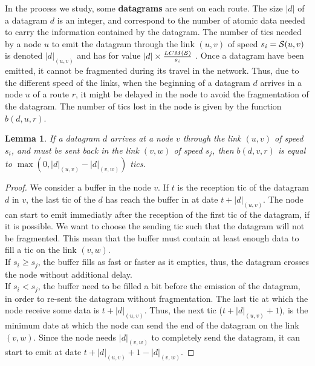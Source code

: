 \documentclass[10pt]{article}
\newtheorem{lemma}[theorem]{Lemma}
\begin{document}
        In the process we study, some {\bf datagrams} are sent on each route. The size $|d|$ of a datagram $d$ is an integer, and correspond to the number of atomic data needed to carry the information contained by the datagram. The number of tics needed by a node $u$ to emit the datagram through the link $(u,v)$ of speed $s_i = {\cal S}(u,v)$ is denoted $|d|_{(u,v)}$ and has for value $ |d| \times \frac{LCM({\cal S})}{s_i}$ . Once a datagram have been emitted, it cannot be fragmented during its travel in the network. Thus, due to the different speed of the links, when the beginning of a datagram $d$ arrives in a node $u$ of a route $r$, it might be delayed in the node to avoid the fragmentation of the datagram. The number of tics lost in the node is given by the function $b(d,u,r)$.\\
        \begin{lemma}
        If a datagram $d$ arrives at a node $v$ through the link $(u,v)$ of speed $s_i$, and must be sent back in the link $(v,w)$ of speed $s_j$, then $b(d,v,r)$ is equal to $ \max( 0, |d|_{(u,v)} - |d|_{(v,w)} )$ tics.
        \end{lemma}
        \begin{proof}
        We consider a buffer in the node $v$. If $t$ is the reception tic of the datagram $d$ in $v$, the last tic of the $d$ has reach the buffer in at date $t+|d|_{(u,v)}$. The node can start to emit immediatly after the reception of the first tic of the datagram, if it is possible. We want to choose the sending tic such that the datagram will not be fragmented. This mean that the buffer must contain at least enough data to fill a tic on the link $(v,w)$.\\
        
        If $s_i \geq s_j$, the buffer fills as fast or faster as it empties, thus, the datagram crosses the node without additional delay.\\
   
        If $s_i < s_j$, the buffer need to be filled a bit before the emission of the datagram, in order to re-sent the datagram without fragmentation. The last tic at which the node receive some data is $t+|d|_{(u,v)}$. Thus, the next tic ($t+|d|_{(u,v)}+1$), is the minimum date at which the node can send the end of the datagram on the link $(v,w)$. Since the node needs $|d|_{(v,w)}$ to completely send the datagram, it can start to emit at date $t+|d|_{(u,v)}+ 1 - |d|_{(v,w)}$. 
        \end{proof}
        
\end{document}

